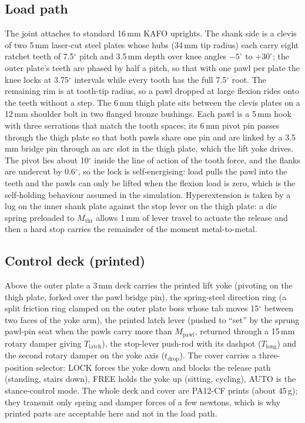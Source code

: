 \documentclass[11pt,a4paper]{article}
\begin{document}
\subsection{Load path}
The joint attaches to standard 16\,mm KAFO uprights. The shank side is a clevis of two 5\,mm laser-cut steel plates whose hubs (34\,mm tip radius) each carry eight ratchet teeth of 7.5$^\circ$ pitch and 3.5\,mm depth over knee angles $-5^\circ$ to $+30^\circ$; the outer plate's teeth are phased by half a pitch, so that with one pawl per plate the knee locks at 3.75$^\circ$ intervals while every tooth has the full 7.5$^\circ$ root. The remaining rim is at tooth-tip radius, so a pawl dropped at large flexion rides onto the teeth without a step. The 6\,mm thigh plate sits between the clevis plates on a 12\,mm shoulder bolt in two flanged bronze bushings. Each pawl is a 5\,mm hook with three serrations that match the tooth spaces; its 6\,mm pivot pin passes through the thigh plate so that both pawls share one pin and are linked by a 3.5\,mm bridge pin through an arc slot in the thigh plate, which the lift yoke drives. The pivot lies about 10$^\circ$ inside the line of action of the tooth force, and the flanks are undercut by 0.6$^\circ$, so the lock is self-energising: load pulls the pawl into the teeth and the pawls can only be lifted when the flexion load is zero, which is the self-holding behaviour assumed in the simulation. Hyperextension is taken by a lug on the inner shank plate against the stop lever on the thigh plate: a die spring preloaded to $M_\mathrm{thr}$ allows 1\,mm of lever travel to actuate the release and then a hard stop carries the remainder of the moment metal-to-metal.

\subsection{Control deck (printed)}
Above the outer plate a 3\,mm deck carries the printed lift yoke (pivoting on the thigh plate, forked over the pawl bridge pin), the spring-steel direction ring (a split friction ring clamped on the outer plate boss whose tab moves 15$^\circ$ between two faces of the yoke arm), the printed latch lever (pushed to ``set'' by the sprung pawl-pin seat when the pawls carry more than $M_\mathrm{pawl}$, returned through a 15\,mm rotary damper giving $T_\mathrm{latch}$), the stop-lever push-rod with its dashpot ($T_\mathrm{long}$) and the second rotary damper on the yoke axis ($t_\mathrm{drop}$). The cover carries a three-position selector: LOCK forces the yoke down and blocks the release path (standing, stairs down), FREE holds the yoke up (sitting, cycling), AUTO is the stance-control mode. The whole deck and cover are PA12-CF prints (about 45\,g); they transmit only spring and damper forces of a few newtons, which is why printed parts are acceptable here and not in the load path.
\end{document}
